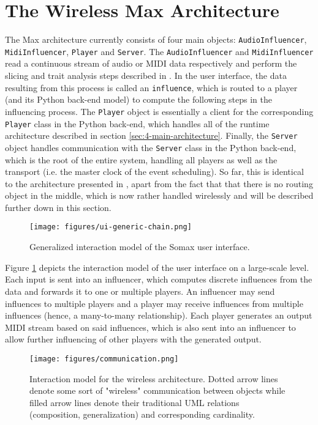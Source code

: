 \section{The Wireless Max Architecture}\label{ssec:max-architecture}
The Max architecture currently consists of four main objects: \texttt{Audio\-Influencer}, \texttt{MidiInfluencer}, \texttt{Player} and \texttt{Server}. The \texttt{AudioInfluencer} and \texttt{Midi\-Influencer} read a continuous stream of audio or MIDI data respectively and perform the slicing and trait analysis steps described in \cite{somaxtheory2021}. In the user interface, the data resulting from this process is called an \texttt{influence}, which is routed to a player (and its Python back-end model) to compute the following steps in the influencing process. The \texttt{Player} object is essentially a client for the corresponding \texttt{Player} class in the Python back-end, which handles all of the runtime architecture described in section \ref{sec:4-main-architecture}. Finally, the \texttt{Server} object handles communication with the \texttt{Server} class in the Python back-end, which is the root of the entire system, handling all players as well as the transport (i.e. the master clock of the event scheduling). So far, this is identical to the architecture presented in \cite{borg_2019}, apart from the fact that that there is no routing object in the middle, which is now rather handled wirelessly and will be described further down in this section.

 \begin{figure}[h!]
    \centering        
 	\texttt{[image: figures/ui-generic-chain.png]}
    \caption{Generalized interaction model of the Somax user interface.}
    \label{fig:somax-interaction}
\end{figure}


Figure \ref{fig:somax-interaction} depicts the interaction model of the user interface on a large-scale level. Each input is sent into an influencer, which computes discrete influences from the data and forwards it to one or multiple players. An influencer may send influences to multiple players and a player may receive influences from multiple influences (hence, a many-to-many relationship). Each player generates an output MIDI stream based on said influences, which is also sent into an influencer to allow further influencing of other players with the generated output. 

 \begin{figure}[h!]
    \centering        
 	\texttt{[image: figures/communication.png]}
    \caption{Interaction model for the wireless architecture. Dotted arrow lines denote some sort of "wireless" communication between objects while filled arrow lines denote their traditional UML relations (composition, generalization) and corresponding cardinality.}
    \label{fig:somax-communication}
\end{figure}

